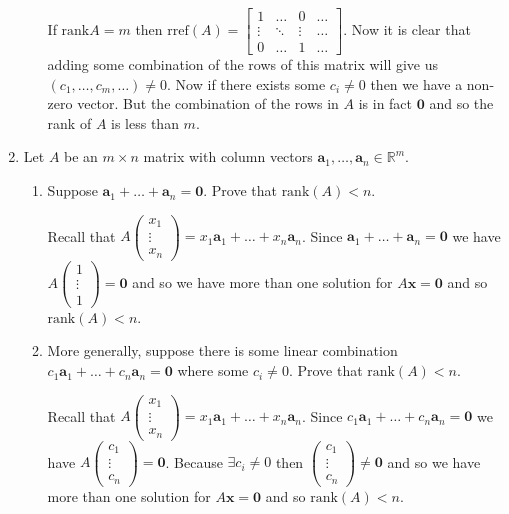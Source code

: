 \documentclass[letterpaper]{article}
\begin{document}
\begin{enumerate}
\begin{enumerate}
  If $\text{rank}A=m$ then
  $\text{rref}(A)=\left[\begin{array}{cccc}
  1&\dots&0&\dots\\
  \vdots&\ddots&\vdots&\dots\\
  0&\dots&1&\dots
  \end{array}\right]$. Now it is clear that adding some combination of the rows of this matrix will give us $(c_1,\dots,c_m,\dots)\ne 0$. Now if there exists some $c_i\ne0$ then we have a non-zero vector. But the combination of the rows in $A$ is in fact $\mathbf{0}$ and so the rank of $A$ is less than $m$.
  \end{enumerate}
\item
Let $A$ be an $m\times n$ matrix with column vectors $\mathbf{a}_1,\dots,\mathbf{a}_n\in\mathbb{R}^m.$
  \begin{enumerate}
  \item
    Suppose $\mathbf{a}_1+\dots+\mathbf{a}_n=\mathbf{0}$. Prove that $\text{rank}(A)<n$.

    Recall that $A\left(\begin{array}{c}x_1\\\vdots\\x_n\end{array}\right)=x_1\mathbf{a}_1+\dots+x_n\mathbf{a}_n$. Since $\mathbf{a}_1+\dots+\mathbf{a}_n=\mathbf{0}$ we have $A\left(\begin{array}{c}1\\\vdots\\1\end{array}\right)=\mathbf{0}$ and so we have more than one solution for $A\mathbf{x}=\mathbf{0}$ and so $\text{rank}(A)<n$.
  \item
    More generally, suppose there is some linear combination $c_1\mathbf{a}_1+\dots+c_n\mathbf{a}_n=\mathbf{0}$ where some $c_i\ne 0$. Prove that $\text{rank}(A)<n$.

    Recall that $A\left(\begin{array}{c}x_1\\\vdots\\x_n\end{array}\right)=x_1\mathbf{a}_1+\dots+x_n\mathbf{a}_n$. Since $c_1\mathbf{a}_1+\dots+c_n\mathbf{a}_n=\mathbf{0}$ we have $A\left(\begin{array}{c}c_1\\\vdots\\c_n\end{array}\right)=\mathbf{0}$. Because $\exists c_i\ne0$ then $\left(\begin{array}{c}c_1\\\vdots\\c_n\end{array}\right)\ne \mathbf{0}$ and so we have more than one solution for $A\mathbf{x}=\mathbf{0}$ and so $\text{rank}(A)<n$.
  \end{enumerate}
\end{enumerate}
\end{document}
